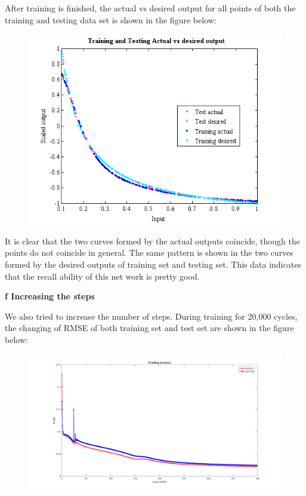 \documentclass[epsfig]{article}
\def\bpar{\vskip26pt}
\def\npar{\vskip13pt}
\begin{document}
After training is finished, the actual vs desired output for all points of both the training and testing data set is shown in the figure below:

\begin{figure}[!htb] 
\centering\includegraphics[width=4.5in]{fig4.png} 
\end{figure} 

It is clear that the two curves formed by the actual outputs coincide, though the points do not coincide in general. The same pattern is shown in the two curves formed by the desired outputs of training set and testing set. This data indicates that the recall ability of this net work is pretty good.

{\bf 
\npar
f Increasing the steps
\bpar
}
 
We also tried to increase the number of steps. During training for 20,000 cycles, the changing of RMSE of both training set and test set are shown in the figure below:

\begin{figure}[!htb] 
\centering\includegraphics[width=6in]{fig5.png} 
\end{figure} 
\end{document}
